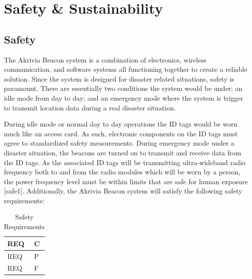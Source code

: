%

\setcounter{section}{4}
\section{Safety \& Sustainability}
\bigskip
\subsection{Safety}
\medskip
The Akrivia Beacon system is a combination of electronics, wireless communication, and software systems all functioning together to create a reliable solution. Since the system is designed for disaster related situations, safety is paramount. There are essentially two conditions the system would be under; an idle mode from day to day; and an emergency mode where the system is trigger to transmit location data during a real disaster situation.

\bigskip
During idle mode or normal day to day operations the ID tags would be worn much like an access card. As such, electronic components on the ID tags must agree to standardized safety measurements. During emergency mode under a disaster situation, the beacons are turned on to transmit and receive data from the ID tags. As the associated ID tags will be transmitting ultra-wideband radio frequency both to and from the radio modules which will be worn by a person, the power frequency level must be within limits that are safe for human exposure [safe1]. Additionally, the Akrivia Beacon system will satisfy the following safety requirements:

\bgroup
\def\arraystretch{1.5}
\begin{table}[H]
\centering
\begin{tabular}{ | m{3cm} | m{13cm}| } 
\hline
REQ & C\\ 
\hline
REQ & P\\ 
\hline
REQ & F\\  
\hline
\end{tabular}
\caption{Safety Requirements}
\end{table}	

\break
